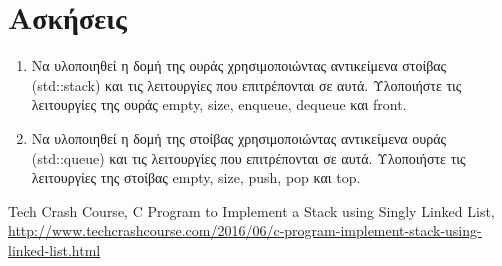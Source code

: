 


\section{Ασκήσεις}
\begin{enumerate}
\item Να υλοποιηθεί η δομή της ουράς χρησιμοποιώντας αντικείμενα στοίβας (std::stack) και τις λειτουργίες που επιτρέπονται σε αυτά. Υλοποιήστε τις λειτουργίες της ουράς empty, size, enqueue, dequeue και front.
\item Να υλοποιηθεί η δομή της στοίβας χρησιμοποιώντας αντικείμενα ουράς (std::queue) και τις λειτουργίες που επιτρέπονται σε αυτά. Υλοποιήστε τις λειτουργίες της στοίβας empty, size, push, pop και top.
\end{enumerate}

\begin{thebibliography}{9}
Tech Crash Course,  C Program to Implement a Stack using Singly Linked List, \href{http://www.techcrashcourse.com/2016/06/c-program-implement-stack-using-linked-list.html}{http://www.techcrashcourse.com/2016/06/c-program-implement-stack-using-linked-list.html}

\end{thebibliography}


